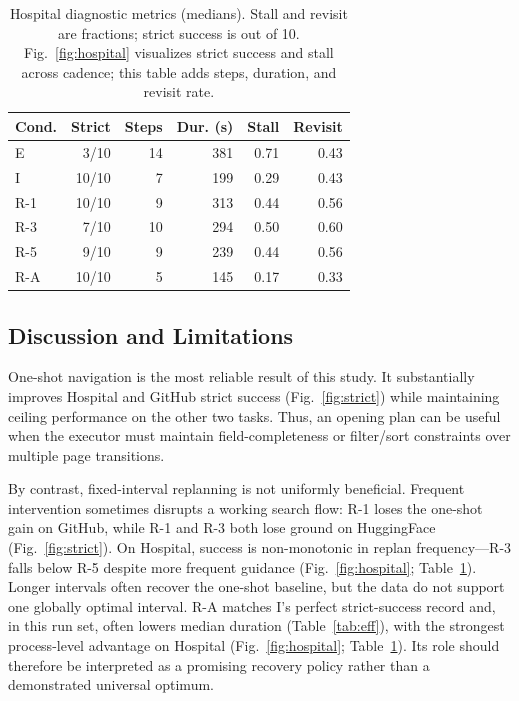 \documentclass{llncs}
\begin{document}
\begin{table}[t]
\centering
\caption{Hospital diagnostic metrics (medians). Stall and revisit are
fractions; strict success is out of 10. Fig.~\ref{fig:hospital} visualizes
strict success and stall across cadence; this table adds steps, duration, and
revisit rate.}
\label{tab:hospital}
\small
\setlength{\tabcolsep}{5pt}
\begin{tabular}{@{}lrrrrr@{}}
\toprule
\textbf{Cond.} & \textbf{Strict} & \textbf{Steps} & \textbf{Dur. (s)} & \textbf{Stall} & \textbf{Revisit} \\
\midrule
E   & 3/10  & 14 & 381 & 0.71 & 0.43 \\
I   & 10/10 & 7  & 199 & 0.29 & 0.43 \\
R-1 & 10/10 & 9  & 313 & 0.44 & 0.56 \\
R-3 & 7/10  & 10 & 294 & 0.50 & 0.60 \\
R-5 & 9/10  & 9  & 239 & 0.44 & 0.56 \\
R-A & 10/10 & 5  & 145 & 0.17 & 0.33 \\
\bottomrule
\end{tabular}
\end{table}

\subsection{Discussion and Limitations}

One-shot navigation is the most reliable result of this study. It substantially
improves Hospital and GitHub strict success (Fig.~\ref{fig:strict}) while
maintaining ceiling performance on the other two tasks. Thus, an opening
plan can be useful when the executor must maintain field-completeness or
filter/sort constraints over multiple page transitions.

By contrast, fixed-interval replanning is not uniformly beneficial. Frequent
intervention sometimes disrupts a working search flow: R-1 loses the one-shot
gain on GitHub, while R-1 and R-3 both lose ground on HuggingFace
(Fig.~\ref{fig:strict}). On Hospital, success is non-monotonic in replan
frequency---R-3 falls below R-5 despite more frequent guidance
(Fig.~\ref{fig:hospital}; Table~\ref{tab:hospital}). Longer intervals often
recover the one-shot baseline, but the data do not support one globally
optimal interval. R-A matches I's perfect strict-success record and, in this
run set, often lowers median duration (Table~\ref{tab:eff}), with the
strongest process-level advantage on Hospital (Fig.~\ref{fig:hospital};
Table~\ref{tab:hospital}). Its role should therefore be interpreted as a
promising recovery policy rather than a demonstrated universal optimum.
\end{document}
